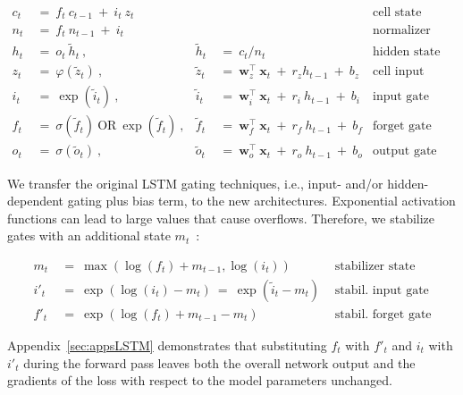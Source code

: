 \begin{align}
\label{eq:slstmforward}
c_t \ &= \  f_t \ c_{t-1} \ + \ i_t \ z_t & & 
 &\text{cell state} \\
n_t \ &= \  f_t \ n_{t-1} \ + \ i_t  & & 
 &\text{normalizer state} \\
h_t \ &= \ o_t \ \tilde{h}_t \ ,
  &\tilde{h}_t \ &= \ c_t / n_t
&\text{hidden state} \\
z_t \ &= \ \varphi \left( \tilde{z}_t \right) \ , 
  &\tilde{z}_t \ &=  \ \mathbf{w}^\top_{z} \ \mathbf{x}_t \ + \
  r_{z}  h_{t-1} \ + \  b_{z}
  &\text{cell input} \\
i_t \ &= \ \!\exp \left( \tilde{i}_t  \right) \ , 
  &\tilde{i}_t \ &= \ \mathbf{w}^\top_{i} \ \mathbf{x}_t \ + \
  r_{i}  \ h_{t-1} \ + \  b_{i}
  &\text{input gate} \\
f_t \ &= \ \sigma \left(  \tilde{f}_t \right) \ \text{OR} \
\!\exp \left(  \tilde{f}_t \right) \ ,
  &\tilde{f}_t \ &= \ \mathbf{w}^\top_{f} \ \mathbf{x}_t  \ + \
  r_{f}  \ h_{t-1} \ + \  b_{f}
  &\text{forget gate} \\
o_t \ &= \ \sigma \left( \tilde{o}_t \right) \ , 
  &\tilde{o}_t  \ &= \ \mathbf{w}^\top_{o} \ \mathbf{x}_t \ + \
  r_{o}  \ h_{t-1} \ + \  b_{o}
  &\text{output gate} 
\end{align}

We transfer the original LSTM gating techniques, i.e., input- and/or hidden-dependent gating plus bias term, to the new architectures. Exponential activation functions can lead to large values that cause overflows. Therefore, we stabilize gates with an additional state \mbox{$m_t$~\citep{Milakov:18arxiv}}:

\begin{align}
\label{eq:slstmstabil}
m_t \ &= \ \max \left( \log ( f_t ) + m_{t-1} , \log ( i_t ) \right) &\text{stabilizer state} \\
i'_t \ &= \ \!\exp \left( \log \left ( i_t \right) - m_t \right) \ = \ \!\exp \left( \tilde{i}_t - m_t \right) \ \, 
  &\text{stabil. input gate} \\
f'_t \ &= \ \!\exp \left( \log \left( f_t \right) + m_{t-1} - m_t \right) \ \, 
  &\text{stabil. forget gate}
\end{align}

Appendix~\ref{sec:appsLSTM} demonstrates that substituting $f_t$ with $f'_t$ and $i_t$ with $i'_t$ during the forward pass leaves both the overall network output and the gradients of the loss with respect to the model parameters unchanged.

